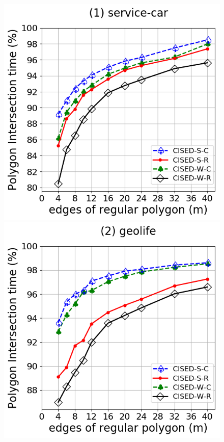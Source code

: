{%

\begin{figure}[tb!]
	\centering
	\includegraphics[scale = 0.290]{Figures/Exp-M-poly-time-ratio-service.png}\hspace{1ex}
	\includegraphics[scale = 0.290]{Figures/Exp-M-poly-time-ratio-geolife.png}\hspace{1ex}

\end{figure}}
